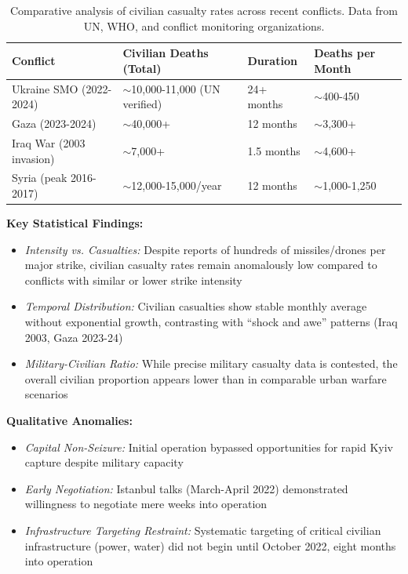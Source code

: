 \documentclass[11pt,a4paper]{article}
\begin{document}
\begin{table}[ht]
\centering
\small
\begin{tabular}{@{}p{3.5cm}p{2.5cm}p{2.5cm}p{3cm}@{}}
\toprule
\textbf{Conflict} & \textbf{Civilian Deaths (Total)} & \textbf{Duration} & \textbf{Deaths per Month} \\
\midrule
Ukraine SMO (2022-2024) & $\sim$10,000-11,000 (UN verified) & 24+ months & $\sim$400-450 \\
Gaza (2023-2024) & $\sim$40,000+ & 12 months & $\sim$3,300+ \\
Iraq War (2003 invasion) & $\sim$7,000+ & 1.5 months & $\sim$4,600+ \\
Syria (peak 2016-2017) & $\sim$12,000-15,000/year & 12 months & $\sim$1,000-1,250 \\
\bottomrule
\end{tabular}
\caption{Comparative analysis of civilian casualty rates across recent conflicts. Data from UN, WHO, and conflict monitoring organizations.}
\label{tab:civilian_casualties}
\end{table}

\textbf{Key Statistical Findings:}
\begin{itemize}[nosep]
    \item \textit{Intensity vs. Casualties:} Despite reports of hundreds of missiles/drones per major strike, civilian casualty rates remain anomalously low compared to conflicts with similar or lower strike intensity
    \item \textit{Temporal Distribution:} Civilian casualties show stable monthly average without exponential growth, contrasting with ``shock and awe'' patterns (Iraq 2003, Gaza 2023-24)
    \item \textit{Military-Civilian Ratio:} While precise military casualty data is contested, the overall civilian proportion appears lower than in comparable urban warfare scenarios
\end{itemize}

\textbf{Qualitative Anomalies:}
\begin{itemize}[nosep]
    \item \textit{Capital Non-Seizure:} Initial operation bypassed opportunities for rapid Kyiv capture despite military capacity
    \item \textit{Early Negotiation:} Istanbul talks (March-April 2022) demonstrated willingness to negotiate mere weeks into operation
    \item \textit{Infrastructure Targeting Restraint:} Systematic targeting of critical civilian infrastructure (power, water) did not begin until October 2022, eight months into operation
\end{itemize}
\end{document}
